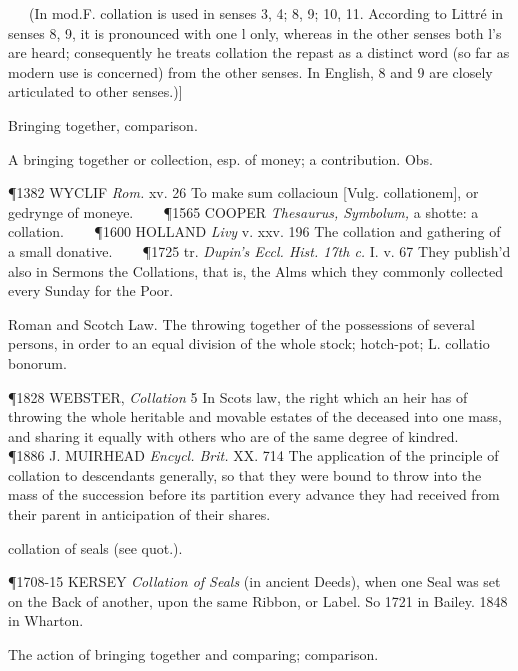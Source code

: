 \begin{description}[wide, labelwidth=!, labelindent=0pt]
   (In mod.F. collation is used in senses 3, 4; 8, 9; 10, 11. According to Littré in senses 8, 9, it is pronounced with one l only, whereas in the other senses both l's are heard; consequently he treats collation the repast as a distinct word (so far as modern use is concerned) from the other senses. In English, 8 and 9 are closely articulated to other senses.)]
\vspace{-0.3cm}

\begin{myenumerate}

 Bringing together, comparison.

 A bringing together or collection, esp. of money; a contribution. Obs.

\P 1382 WYCLIF  \textit{Rom.} xv. 26 To make sum collacioun [Vulg. collationem], or gedrynge of moneye.    
\P 1565 COOPER  \textit{Thesaurus, Symbolum,} a shotte: a collation.    
\P 1600 HOLLAND  \textit{Livy} v. xxv. 196 The collation and gathering of a small donative.    
\P 1725 tr. \textit{Dupin's Eccl. Hist. 17th c.} I. v. 67 They publish'd also in Sermons the Collations, that is, the Alms which they commonly collected every Sunday for the Poor.

 Roman and Scotch Law. The throwing together of the possessions of several persons, in order to an equal division of the whole stock; hotch-pot; L. collatio bonorum.

\P 1828 WEBSTER,  \textit{Collation} 5 In Scots law, the right which an heir has of throwing the whole heritable and movable estates of the deceased into one mass, and sharing it equally with others who are of the same degree of kindred.    
\P 1886 J. MUIRHEAD  \textit{Encycl. Brit.} XX. 714 The application of the principle of collation to descendants generally, so that they were bound to throw into the mass of the succession before its partition every advance they had received from their parent in anticipation of their shares.

 collation of seals (see quot.).

\P 1708-15 KERSEY  \textit{Collation of Seals} (in ancient Deeds), when one Seal was set on the Back of another, upon the same Ribbon, or Label. So 1721 in Bailey. 1848 in Wharton.

 The action of bringing together and comparing; comparison.


\end{myenumerate}
\end{description}
